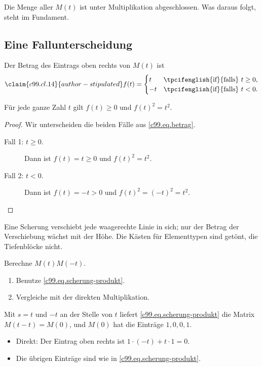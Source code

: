 \begin{remark}
  Die Menge aller $M(t)$ ist unter Multiplikation abgeschlossen. Was daraus
  folgt, steht im Fundament.
\end{remark}

\subsection{Eine Fallunterscheidung}\label{c99.s2.2}

Der Betrag des Eintrags oben rechts von $M(t)$ ist
\begin{equation}\label{c99.eq.betrag}\claim{c99.cl.14}{author-stipulated}
  f(t) =
  \begin{cases}
    t  & \text{\tpcifenglish{if}{falls}}\ t \geq 0, \\
    -t & \text{\tpcifenglish{if}{falls}}\ t < 0.
  \end{cases}
\end{equation}

\begin{proposition}\label{c99.prop.betrag}
  Für jede ganze Zahl $t$ gilt $f(t) \geq 0$ und $f(t)^2 = t^2$.
\end{proposition}
\begin{proof}
  Wir unterscheiden die beiden Fälle aus \eqref{c99.eq.betrag}.
  \begin{description}
    \item[Fall 1: $t \geq 0$.] Dann ist $f(t) = t \geq 0$ und $f(t)^2 = t^2$.
    \item[Fall 2: $t < 0$.] Dann ist $f(t) = -t > 0$ und
      $f(t)^2 = (-t)^2 = t^2$.
  \end{description}
\end{proof}

\begin{intuition}
  Eine Scherung verschiebt jede waagerechte Linie in sich; nur der Betrag der
  Verschiebung wächst mit der Höhe. Die Kästen für Elementtypen sind getönt, die
  Tiefenblöcke nicht.
\end{intuition}

\begin{exercise}\label{c99.exc.umkehrung}
  Berechne $M(t)M(-t)$.
  \begin{enumerate}
    \item Benutze \eqref{c99.eq.scherung-produkt}.
    \item Vergleiche mit der direkten Multiplikation.
  \end{enumerate}
\end{exercise}
\begin{solution}
  Mit $s = t$ und $-t$ an der Stelle von $t$ liefert \eqref{c99.eq.scherung-produkt}
  die Matrix $M(t - t) = M(0)$, und $M(0)$ hat die Einträge $1, 0, 0, 1$.
  \begin{itemize}
    \item Direkt: Der Eintrag oben rechts ist $1\cdot(-t) + t\cdot 1 = 0$.
    \item Die übrigen Einträge sind wie in \eqref{c99.eq.scherung-produkt}.
  \end{itemize}
\end{solution}

